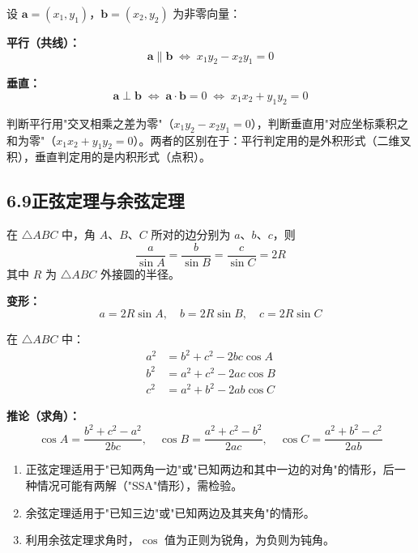 \documentclass[12pt, a4paper]{ctexart}
\begin{document}
\begin{knowledgebox}[平行与垂直的充要条件]
设 $\boldsymbol{a}=(x_1,y_1)$，$\boldsymbol{b}=(x_2,y_2)$ 为非零向量：

\textbf{平行（共线）：}
\[
\boldsymbol{a}\parallel\boldsymbol{b}\;\Longleftrightarrow\; x_1 y_2-x_2 y_1=0
\]

\textbf{垂直：}
\[
\boldsymbol{a}\perp\boldsymbol{b}\;\Longleftrightarrow\;\boldsymbol{a}\cdot\boldsymbol{b}=0\;\Longleftrightarrow\; x_1 x_2+y_1 y_2=0
\]
\end{knowledgebox}

\begin{tipbox}[规律总结]
判断平行用"交叉相乘之差为零"（$x_1 y_2-x_2 y_1=0$），判断垂直用"对应坐标乘积之和为零"（$x_1 x_2+y_1 y_2=0$）。两者的区别在于：平行判定用的是外积形式（二维叉积），垂直判定用的是内积形式（点积）。
\end{tipbox}

\subsection*{6.9\quad 正弦定理与余弦定理}

\begin{knowledgebox}[正弦定理]
在 $\triangle ABC$ 中，角 $A$、$B$、$C$ 所对的边分别为 $a$、$b$、$c$，则
\[
\frac{a}{\sin A}=\frac{b}{\sin B}=\frac{c}{\sin C}=2R
\]
其中 $R$ 为 $\triangle ABC$ 外接圆的半径。

\textbf{变形：}
\[
a=2R\sin A,\quad b=2R\sin B,\quad c=2R\sin C
\]
\end{knowledgebox}

\begin{knowledgebox}[余弦定理]
在 $\triangle ABC$ 中：
\[
\begin{aligned}
a^2 &= b^2+c^2-2bc\cos A \\
b^2 &= a^2+c^2-2ac\cos B \\
c^2 &= a^2+b^2-2ab\cos C
\end{aligned}
\]

\textbf{推论（求角）：}
\[
\cos A=\frac{b^2+c^2-a^2}{2bc},\quad
\cos B=\frac{a^2+c^2-b^2}{2ac},\quad
\cos C=\frac{a^2+b^2-c^2}{2ab}
\]
\end{knowledgebox}

\begin{warnbox}[易错提醒]
\begin{enumerate}[leftmargin=2em]
  \item 正弦定理适用于"已知两角一边"或"已知两边和其中一边的对角"的情形，后一种情况可能有两解（"SSA"情形），需检验。
  \item 余弦定理适用于"已知三边"或"已知两边及其夹角"的情形。
  \item 利用余弦定理求角时，$\cos$ 值为正则为锐角，为负则为钝角。
\end{enumerate}
\end{warnbox}
\end{document}

